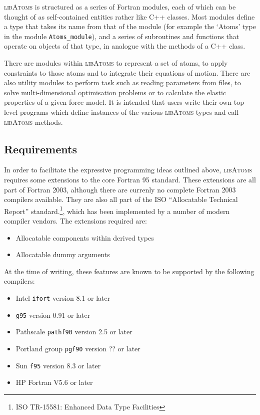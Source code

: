 \textsc{libAtoms} is structured as a series of Fortran modules, each of which
can be thought of as self-contained entities rather like C++ classes. Most
modules define a type that takes its name from that of the module
(for example the `Atoms' type in the module \texttt{Atoms\_module}),
and a series of subroutines and functions that operate on objects
of that type, in analogue with the methods of a C++ class.

There are modules within \textsc{libAtoms} to represent a set of
atoms, to apply constraints to those atoms and to integrate their
equations of motion. There are also utility modules to perform task
such as reading parameters from files, to solve multi-dimensional
optimisation problems or to calculate the elastic properties of a
given force model. It is intended that users write their own top-level
programs which define instances of the various \textsc{libAtoms} types
and call \textsc{libAtoms} methods.

\subsection*{Requirements}

In order to facilitate the expressive programming ideas outlined
above, \textsc{libAtoms} requires some extensions to the core Fortran
95 standard. These extensions are all part of Fortran 2003, although
there are currenly no complete Fortran 2003 compilers available. They
are also all part of the ISO ``Allocatable Technical Report''
standard.\footnote{ISO TR-15581: Enhanced Data Type Facilities}, which
has been implemented by a number of modern compiler vendors. The
extensions required are:
\begin{itemize}
\item Allocatable components within derived types
\item Allocatable dummy arguments
\end{itemize}

At the time of writing, these features are known to be
supported by the following compilers:
\begin{itemize}
\item Intel \texttt{ifort} version 8.1 or later
\item \texttt{g95} version 0.91 or later
\item Pathscale \texttt{pathf90} version 2.5 or later
\item Portland group \texttt{pgf90} version ?? or later
\item Sun \texttt{f95} version 8.3 or later
\item HP Fortran V5.6 or later
\end{itemize}


